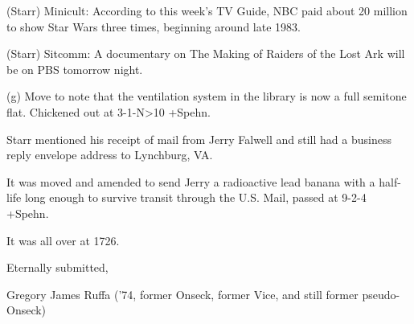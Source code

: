 \documentclass[12pt]{article}
\begin{document}
(Starr) Minicult: According to this week's TV Guide, NBC paid about 20 million to show Star Wars three times, beginning around late 1983.

(Starr) Sitcomm: A documentary on The Making of Raiders of the Lost Ark will be on PBS tomorrow night.

(g) Move to note that the ventilation system in the library is now a full semitone flat. Chickened out at 3-1-N>10 +Spehn.

Starr mentioned his receipt of mail from Jerry Falwell and still had a business reply envelope address to Lynchburg, VA.

It was moved and amended to send Jerry a radioactive lead banana with a half-life long enough to survive transit through the U.S. Mail, passed at 9-2-4 +Spehn.

\vspace{12pt}

\noindent
It was all over at 1726.

\vspace{18pt}

\centerline{Eternally submitted,}
\centerline{Gregory James Ruffa ('74, former Onseck, former Vice, and still former pseudo-Onseck)}
\end{document}
